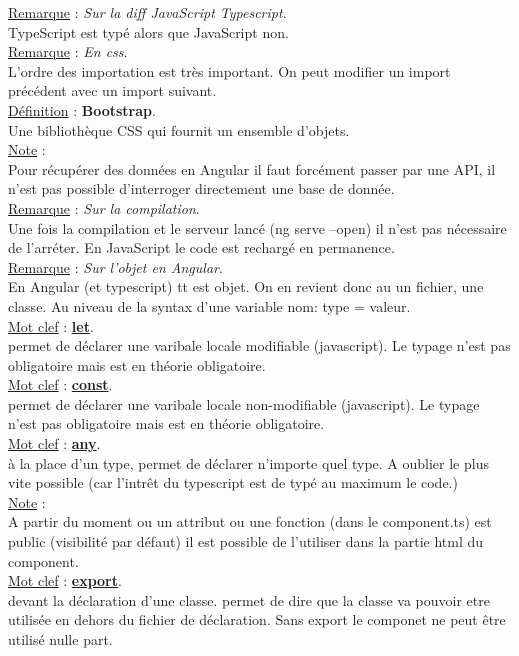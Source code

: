 \documentclass[a4paper,12pt,twoside]{article}
\newcommand{\urlcolor}{magenta}  %
\newcommand{\keycolor}{purple} %
\newcommand{\incode}[1]{{\footnotesize\ttfamily #1}} %
\newcommand{\rem}[2]{\noindent\underline{Remarque} : \textit{#1}.\\ \indent #2}
\newcommand{\note}[1]{\noindent\underline{Note} : \\ \indent #1}
\newcommand{\defi}[2]{\noindent\underline{Définition} : \textbf{#1}.\\ \indent #2}
\newcommand{\keyref}[2]{\hypersetup{urlcolor=\keycolor} \href{#1}{\textbf{#2}}\hypersetup{urlcolor=\urlcolor}}
\newcommand{\keyword}[3]{\noindent\underline{Mot clef} : \keyref{#1}{#2}. \\ \indent #3}
\begin{document}
\rem{Sur la diff JavaScript Typescript}{TypeScript est typé alors que JavaScript non.}\\

\rem{En css}{L'ordre des importation est très important. On peut modifier un import précédent avec un import suivant.}\\

\defi{Bootstrap}{Une bibliothèque CSS qui fournit un ensemble d'objets.}\\

\note{Pour récupérer des données en Angular il faut forcément passer par une API, il n'est pas possible d'interroger directement une base de donnée.}\\

\rem{Sur la compilation}{Une fois la compilation et le serveur lancé (\incode{ng serve --open}) il n'est pas nécessaire de l'arréter. En JavaScript le code est rechargé en permanence.}\\

\rem{Sur l'objet en Angular}{En Angular (et typescript) tt est objet. On en revient donc au un fichier, une classe. Au niveau de la syntax d'une variable nom: type = valeur.}\\

\keyword{https://developer.mozilla.org/fr/docs/Web/JavaScript/Reference/Statements/let}{let}{permet de déclarer une varibale locale modifiable (javascript). Le typage n'est pas obligatoire mais est en théorie obligatoire.}\\

\keyword{https://developer.mozilla.org/fr/docs/Web/JavaScript/Reference/Statements/const}{const}{permet de déclarer une varibale locale non-modifiable (javascript). Le typage n'est pas obligatoire mais est en théorie obligatoire.}\\

\keyword{}{any}{à la place d'un type, permet de déclarer n'importe quel type. A oublier le plus vite possible (car l'intrêt du typescript est de typé au maximum le code.)}\\

\note{A partir du moment ou un attribut ou une fonction (dans le component.ts) est public (visibilité par défaut) il est possible de l'utiliser dans la partie html du component.}\\

\keyword{}{export}{devant la déclaration d'une classe. permet de dire que la classe va pouvoir etre utilisée en dehors du fichier de déclaration. Sans \incode{export} le componet ne peut être utilisé nulle part.}\\
\end{document}
